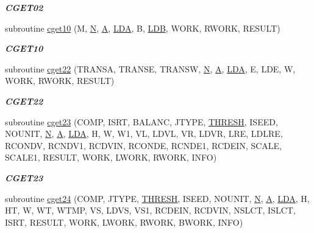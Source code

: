 \begin{DoxyCompactItemize}
\begin{DoxyCompactList}\small\item\em {\bfseries C\+G\+E\+T02} \end{DoxyCompactList}\item 
subroutine \hyperlink{group__complex__eig_ga3dbf4135e14f662ed4f3486c218d7132}{cget10} (M, \hyperlink{polmisc_8c_a0240ac851181b84ac374872dc5434ee4}{N}, \hyperlink{classA}{A}, \hyperlink{example__user_8c_ae946da542ce0db94dced19b2ecefd1aa}{L\+D\+A}, B, \hyperlink{example__user_8c_a50e90a7104df172b5a89a06c47fcca04}{L\+D\+B}, W\+O\+R\+K, R\+W\+O\+R\+K, R\+E\+S\+U\+L\+T)
\begin{DoxyCompactList}\small\item\em {\bfseries C\+G\+E\+T10} \end{DoxyCompactList}\item 
subroutine \hyperlink{group__complex__eig_gaba7f4c1d3cb97e0b5812937d39270e81}{cget22} (T\+R\+A\+N\+S\+A, T\+R\+A\+N\+S\+E, T\+R\+A\+N\+S\+W, \hyperlink{polmisc_8c_a0240ac851181b84ac374872dc5434ee4}{N}, \hyperlink{classA}{A}, \hyperlink{example__user_8c_ae946da542ce0db94dced19b2ecefd1aa}{L\+D\+A}, E, L\+D\+E, W, W\+O\+R\+K, R\+W\+O\+R\+K, R\+E\+S\+U\+L\+T)
\begin{DoxyCompactList}\small\item\em {\bfseries C\+G\+E\+T22} \end{DoxyCompactList}\item 
subroutine \hyperlink{group__complex__eig_ga348eb5544a2d2680f42ba665fcd5b81c}{cget23} (C\+O\+M\+P, I\+S\+R\+T, B\+A\+L\+A\+N\+C, J\+T\+Y\+P\+E, \hyperlink{zlaqgs_8c_a0656018abfc9fa2821827415f5d5ea57}{T\+H\+R\+E\+S\+H}, I\+S\+E\+E\+D, N\+O\+U\+N\+I\+T, \hyperlink{polmisc_8c_a0240ac851181b84ac374872dc5434ee4}{N}, \hyperlink{classA}{A}, \hyperlink{example__user_8c_ae946da542ce0db94dced19b2ecefd1aa}{L\+D\+A}, H, W, W1, V\+L, L\+D\+V\+L, V\+R, L\+D\+V\+R, L\+R\+E, L\+D\+L\+R\+E, R\+C\+O\+N\+D\+V, R\+C\+N\+D\+V1, R\+C\+D\+V\+I\+N, R\+C\+O\+N\+D\+E, R\+C\+N\+D\+E1, R\+C\+D\+E\+I\+N, S\+C\+A\+L\+E, S\+C\+A\+L\+E1, R\+E\+S\+U\+L\+T, W\+O\+R\+K, L\+W\+O\+R\+K, R\+W\+O\+R\+K, I\+N\+F\+O)
\begin{DoxyCompactList}\small\item\em {\bfseries C\+G\+E\+T23} \end{DoxyCompactList}\item 
subroutine \hyperlink{group__complex__eig_gafb74cf216cc7b889b8b724e1917e0cd7}{cget24} (C\+O\+M\+P, J\+T\+Y\+P\+E, \hyperlink{zlaqgs_8c_a0656018abfc9fa2821827415f5d5ea57}{T\+H\+R\+E\+S\+H}, I\+S\+E\+E\+D, N\+O\+U\+N\+I\+T, \hyperlink{polmisc_8c_a0240ac851181b84ac374872dc5434ee4}{N}, \hyperlink{classA}{A}, \hyperlink{example__user_8c_ae946da542ce0db94dced19b2ecefd1aa}{L\+D\+A}, H, H\+T, W, W\+T, W\+T\+M\+P, V\+S, L\+D\+V\+S, V\+S1, R\+C\+D\+E\+I\+N, R\+C\+D\+V\+I\+N, N\+S\+L\+C\+T, I\+S\+L\+C\+T, I\+S\+R\+T, R\+E\+S\+U\+L\+T, W\+O\+R\+K, L\+W\+O\+R\+K, R\+W\+O\+R\+K, B\+W\+O\+R\+K, I\+N\+F\+O)

\end{DoxyCompactItemize}
